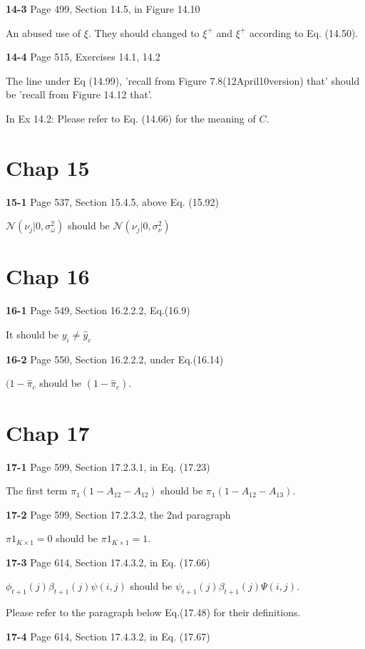 \documentclass[aps,preprint,a4]{revtex4-1}
\begin{document}
{\color{red}\textbf{14-3}} Page 499, Section 14.5, in Figure 14.10

An abused use of $\xi$. They should changed to $\xi^{+}$ and $\xi^{+}$ according to
Eq. (14.50).

{\color{red}\textbf{14-4}} Page 515, Exercises 14.1, 14.2

The line under Eq (14.99), 'recall from Figure 7.8(12April10version) that' should be 
'recall from Figure 14.12 that'.

In Ex 14.2: Please refer to Eq. (14.66) for the meaning of $C$.

\section{Chap 15}
{\color{red}\textbf{15-1}} Page 537, Section 15.4.5, above Eq. (15.92)

$\mathcal N(\nu_{j}|0,\sigma_{\omega}^{2})$ should be $\mathcal N(\nu_{j}|0,\sigma_{\nu}^{2})$


\section{Chap 16}
{\color{red}\textbf{16-1}} Page 549, Section 16.2.2.2, Eq.(16.9)

It should be $y_{i} \neq \hat{y}_{c}$

{\color{red}\textbf{16-2}} Page 550, Section 16.2.2.2, under Eq.(16.14)

$(1-\hat {\pi}_{c}$ should be $(1-\hat {\pi}_{c})$.


\section{Chap 17}
{\color{red}\textbf{17-1}} Page 599, Section 17.2.3.1, in Eq. (17.23)

The first term $\pi_{1}(1-A_{12}-A_{12})$ should be $\pi_{1}(1-A_{12}-A_{13})$.

{\color{red}\textbf{17-2}} Page 599, Section 17.2.3.2, the 2nd paragraph

$\pi 1_{K\times 1}=0$ should be $\pi 1_{K\times 1}=1$.

{\color{red}\textbf{17-3}} Page 614, Section 17.4.3.2, in Eq. (17.66)

$\phi_{t+1}(j)\beta_{t+1}(j)\psi(i,j)$ should be $\psi_{t+1}(j)\beta_{t+1}(j)\Psi(i,j)$.

Please refer to the paragraph below Eq.(17.48) for their definitions.

{\color{red}\textbf{17-4}} Page 614, Section 17.4.3.2, in Eq. (17.67)
\end{document}
